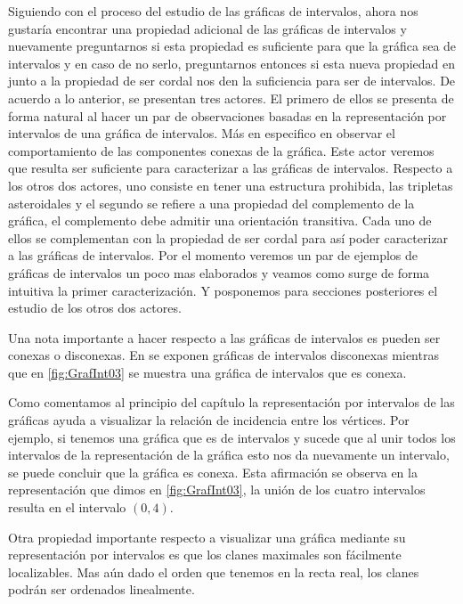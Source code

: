 Siguiendo con el proceso del estudio de las gráficas de intervalos, ahora nos gustaría encontrar una propiedad adicional de las gráficas de intervalos y nuevamente preguntarnos si esta propiedad es suficiente para que la gráfica sea de intervalos y en caso de no serlo, preguntarnos entonces si esta nueva propiedad en junto a la propiedad de ser cordal nos den la suficiencia para ser de intervalos.
De acuerdo a lo anterior, se presentan tres actores. El primero de ellos se presenta de forma natural al hacer un par de observaciones basadas en la representación por intervalos de una gráfica de intervalos. Más en especifico en observar el comportamiento de las componentes conexas de la gráfica. Este actor veremos que resulta ser suficiente para caracterizar a las gráficas de intervalos. Respecto a los otros dos actores, uno consiste en tener una estructura prohibida, las tripletas asteroidales y el segundo se refiere a una propiedad del complemento de la gráfica, el complemento debe admitir una orientación transitiva. Cada uno de ellos se complementan con la propiedad de ser cordal para así poder caracterizar a las gráficas de intervalos. 
Por el momento veremos un par de ejemplos de gráficas de intervalos un poco mas elaborados y veamos como surge de forma intuitiva la primer caracterización. Y posponemos para secciones posteriores el estudio de los otros dos actores.

Una nota importante a hacer respecto a las gráficas de intervalos es pueden ser conexas o disconexas. En  se exponen gráficas de intervalos disconexas mientras que en \cref{fig:GrafInt03} se muestra una gráfica de intervalos que es conexa. 

Como comentamos al principio del capítulo la representación por intervalos de las gráficas ayuda a visualizar la relación de incidencia entre los vértices. Por ejemplo, si tenemos una gráfica que es de intervalos y sucede que al unir todos los intervalos de la representación de la gráfica esto nos da nuevamente un intervalo, se puede concluir que la gráfica es conexa.
Esta afirmación se observa en la representación que dimos en \cref{fig:GrafInt03}, la unión de los cuatro intervalos resulta en el intervalo $(0,4)$.

Otra propiedad importante respecto a visualizar una gráfica mediante su representación por intervalos es que los clanes maximales son fácilmente localizables. Mas aún dado el orden que tenemos en la recta real, los clanes podrán ser ordenados linealmente.

